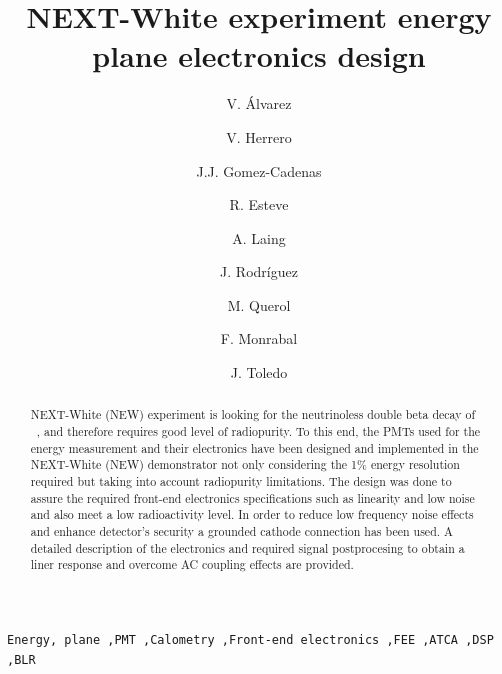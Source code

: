 \documentclass[a4paper, 10pt, oneside, twocolumn, 3p]{elsarticle}
\begin{document}
\setlength{\parskip}{4mm}
\sloppy {}

\begin{frontmatter}

\title{NEXT-White experiment energy plane electronics design}

\author[mymainaddress]{V. \'Alvarez} 
\author[mysecondaryaddress]{V. Herrero}
\author[mymainaddress]{J.J. Gomez-Cadenas} 
\author[mysecondaryaddress]{R. Esteve} 
\author[mysecondaryaddress]{A. Laing} 
\author[mysecondaryaddress]{J. Rodríguez} 
\author[mymainaddress]{M. Querol} 
\author[mysecondaryaddress2]{F. Monrabal} 
\author[mysecondaryaddress]{J. Toledo} 

\address[mymainaddress]{Instituto de Física Corpuscular(IFIC), CSIC \& Universitat de València \\ Calle Catedrático José Beltrán, 2, 46980 Paterna, Valencia, Spain} 
\address[mysecondaryaddress]{Instituto de Instrumentación para Imagen Molecular (I3M), Universtitat Politècnica de València \\ Camino de vera, s/n, Edificio 8B, 46022 Valencia, Spain}
\address[mysecondaryaddress2]{Departament of Physics, University of Texas at Arlington\\ Arlington, Texas 76019, USA}

\begin{abstract}
NEXT-White (NEW) experiment is looking for the neutrinoless double beta decay of  \XE\ , and therefore requires good level of radiopurity. To this end, the PMTs used for the energy measurement and their electronics have been designed and implemented in the NEXT-White (NEW) demonstrator not only considering the 1\% energy resolution required but taking into account radiopurity limitations. The design was done to assure the required front-end electronics specifications such as linearity and low noise and also meet a low radioactivity level. In order to reduce low frequency noise effects and enhance detector's security a grounded cathode connection has been used. A detailed description of the electronics and required signal postprocesing to obtain a liner response and overcome AC coupling effects are provided.

\end{abstract}

\begin{keyword}

 \texttt{Energy, plane  \sep PMT \sep Calometry \sep Front-end electronics \sep FEE  \sep ATCA \sep DSP  \sep BLR}
 

\end{keyword}


\end{frontmatter}
\end{document}
